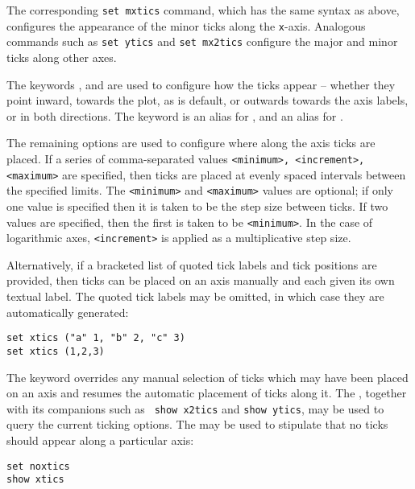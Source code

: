 The corresponding {\tt set mxtics} command, which has the same syntax as above,
configures the appearance of the minor ticks along the {\tt x}-axis. Analogous
commands such as {\tt set ytics} and {\tt set mx2tics} configure the major and
minor ticks along other axes.

The keywords ,  and  are used to
configure how the ticks appear -- whether they point inward, towards the plot,
as is default, or outwards towards the axis labels, or in both directions.  The
keyword  is an alias for , and 
an alias for .

The remaining options are used to configure where along the axis ticks are
placed. If a series of comma-separated values {\tt <minimum>, <increment>,
<maximum>} are specified, then ticks are placed at evenly spaced intervals
between the specified limits. The {\tt <minimum>} and {\tt <maximum>} values
are optional; if only one value is specified then it is taken to be the step
size between ticks. If two values are specified, then the first is taken to be
{\tt <minimum>}. In the case of logarithmic axes, {\tt <increment>} is applied
as a multiplicative step size.

Alternatively, if a bracketed list of quoted tick labels and tick positions are
provided, then ticks can be placed on an axis manually and each given its own
textual label. The quoted tick labels may be omitted, in which case they are
automatically generated:
\begin{verbatim}
set xtics ("a" 1, "b" 2, "c" 3)
set xtics (1,2,3)
\end{verbatim}
The keyword  overrides any manual selection of ticks which
may have been placed on an axis and resumes the automatic placement of ticks
along it. The , together with its companions such as {\tt
show x2tics} and {\tt show ytics}, may be used to query the current ticking
options. The  may be used to stipulate that no ticks
should appear along a particular axis:

\begin{verbatim}
set noxtics
show xtics
\end{verbatim}


